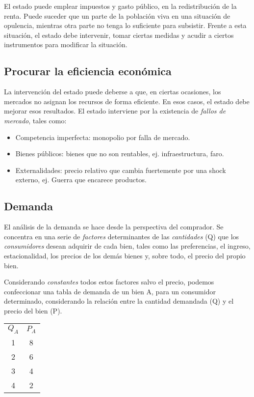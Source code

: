 El estado puede emplear impuestos y gasto público,
en la redistribución de la renta.
Puede suceder que un parte de la población
viva en una situación de opulencia,
mientras otra parte no tenga lo suficiente para subsistir.
Frente a esta situación,
el estado debe intervenir, tomar ciertas medidas
y acudir a ciertos instrumentos para modificar la situación.

\subsection{Procurar la eficiencia económica}

La intervención del estado puede deberse a que,
en ciertas ocasiones,
los mercados no asignan los recursos de forma eficiente.
En esos casos,
el estado debe mejorar esos resultados.
El estado interviene por la existencia de \textit{fallos de mercado},
tales como:
\begin{itemize}
    \item Competencia imperfecta: monopolio por falla de mercado.
    \item Bienes públicos: bienes que no son rentables, ej. infraestructura, faro.
    \item Externalidades: precio relativo que cambia fuertemente por una shock externo,
    ej. Guerra que encarece productos.
\end{itemize}

\subsection{Demanda}

El análisis de la demanda se hace desde la perspectiva del comprador.
Se concentra en una serie de \textit{factores} determinantes de las \textit{cantidades} (Q)
que los \textit{consumidores} desean adquirir de cada bien, 
tales como las preferencias, 
el ingreso,
estacionalidad, 
los precios de los demás bienes y, sobre todo,
el precio del propio bien.

Considerando \textit{constantes} todos estos factores salvo el precio,
podemos confeccionar una tabla de demanda de un bien A,
para un consumidor determinado,
considerando la relación entre la cantidad demandada (Q)
y el precio del bien (P).

\begin{tabular}{ c c }
    \(Q_A\) & \(P_A\) \\
    1       & 8       \\
    2       & 6       \\
    3       & 4       \\
    4       & 2       \\
\end{tabular}

